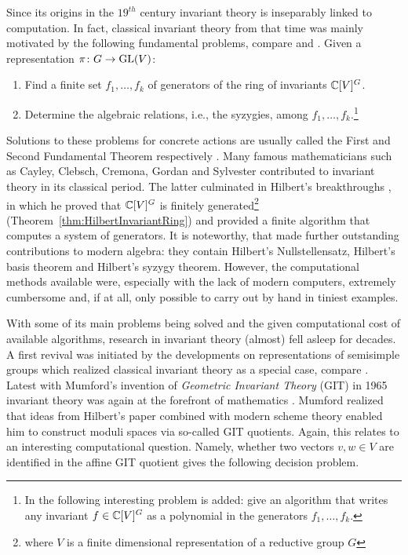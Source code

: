 Since its origins in the $19^{th}$ century invariant theory is inseparably linked to computation. In fact, classical invariant theory from that time was mainly motivated by the following fundamental problems, compare \cite[Section~1.5]{kraft1996classical} and \cite[Section~1.3]{SturmfelsBookInvariant}.
Given a representation $\pi \colon G \to \operatorname{GL}(V)$:
	\begin{enumerate}
		\item Find a finite set $f_1,\ldots,f_k$ of generators of the ring of invariants $\mathbb C[V]^G$.
		
		\item Determine the algebraic relations, i.e., the syzygies, among $f_1,\ldots,f_k$.\footnote{In \cite{SturmfelsBookInvariant} the following interesting problem is added: give an algorithm that writes any invariant $f \in \mathbb C[V]^G$ as a polynomial in the generators $f_1,\ldots,f_k$.}
	\end{enumerate}
Solutions to these problems for concrete actions are usually called the First and Second Fundamental Theorem respectively \cite{kraft1996classical}.
Many famous mathematicians such as Cayley, Clebsch, Cremona, Gordan and Sylvester contributed to invariant theory in its classical period. The latter culminated in Hilbert's breakthroughs \cite{Hilbert1890, Hilbert1893}, in which he proved that $\mathbb C[V]^G$ is finitely generated\footnote{where $V$ is a finite dimensional representation of a reductive group $G$}
(Theorem~\ref{thm:HilbertInvariantRing}) and provided a finite algorithm that computes a system of generators. It is noteworthy, that \cite{Hilbert1890, Hilbert1893} made further outstanding contributions to modern algebra: they contain Hilbert's Nullstellensatz, Hilbert's basis theorem and Hilbert's syzygy theorem. However, the computational methods available were, especially with the lack of modern computers, extremely cumbersome and, if at all, only possible to carry out by hand in tiniest examples.

With some of its main problems being solved and the given computational cost of available algorithms, research in invariant theory (almost) fell asleep for decades. A first revival was initiated by the developments on representations of semisimple groups which realized classical invariant theory as a special case, compare \cite{weyl1946classical}. Latest with Mumford's invention of \emph{Geometric Invariant Theory} (GIT) in 1965 invariant theory was again at the forefront of mathematics \cite{MumfordGITbook}. Mumford realized that ideas from  Hilbert's paper \cite{Hilbert1893} combined with modern scheme theory enabled him to construct moduli spaces via so-called GIT quotients. Again, this relates to an interesting computational question. Namely, whether two vectors $v,w \in V$ are identified in the affine GIT quotient gives the following decision problem.

